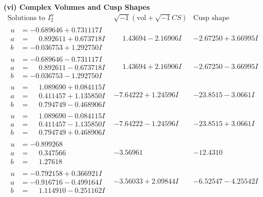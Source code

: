 \documentclass[1p]{elsarticle_modified}
\theoremstyle{definition}
\newcommand{\I}{\sqrt{-1}}
\begin{document}
\newpage\flushleft \textbf{(vi) Complex Volumes and Cusp Shapes}
$$\begin{array}{c|c|c}  
\text{Solutions to }I^u_{2}& \I (\text{vol} + \sqrt{-1}CS) & \text{Cusp shape}\\
 \hline 
\begin{aligned}
u &= -0.689646 + 0.731117 I \\
a &= \phantom{-}0.892611 + 0.673718 I \\
b &= -0.036753 + 1.292750 I\end{aligned}
 & \phantom{-}1.43694 - 2.16906 I & -2.67250 + 3.66995 I \\ \hline\begin{aligned}
u &= -0.689646 - 0.731117 I \\
a &= \phantom{-}0.892611 - 0.673718 I \\
b &= -0.036753 - 1.292750 I\end{aligned}
 & \phantom{-}1.43694 + 2.16906 I & -2.67250 - 3.66995 I \\ \hline\begin{aligned}
u &= \phantom{-}1.089690 + 0.084115 I \\
a &= \phantom{-}0.411457 + 1.135850 I \\
b &= \phantom{-}0.794749 - 0.468906 I\end{aligned}
 & -7.64222 + 1.24596 I & -23.8515 - 3.0661 I \\ \hline\begin{aligned}
u &= \phantom{-}1.089690 - 0.084115 I \\
a &= \phantom{-}0.411457 - 1.135850 I \\
b &= \phantom{-}0.794749 + 0.468906 I\end{aligned}
 & -7.64222 - 1.24596 I & -23.8515 + 3.0661 I \\ \hline\begin{aligned}
u &= -0.899268\phantom{ +0.000000I} \\
a &= \phantom{-}0.347566\phantom{ +0.000000I} \\
b &= \phantom{-}1.27618\phantom{ +0.000000I}\end{aligned}
 & -3.56961\phantom{ +0.000000I} & -12.4310\phantom{ +0.000000I} \\ \hline\begin{aligned}
u &= -0.792158 + 0.366921 I \\
a &= -0.916716 - 0.499164 I \\
b &= \phantom{-}1.114910 - 0.251162 I\end{aligned}
 & -3.56033 + 2.09844 I & -6.52547 - 4.25542 I \\ \hline\begin{aligned}

\end{aligned}
\end{array}$$
\end{document}
